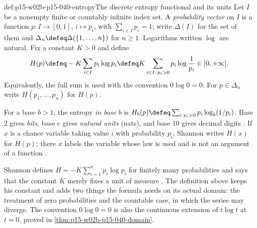\begin{hbdefinition}{def:p15-w02b-p15-040-entropy}{The discrete entropy functional and its units}
Let \(I\) be a nonempty finite or countably infinite index set. A
\emph{probability vector} on \(I\) is a function
\(p:I\to[0,1]\), \(i\mapsto p_i\), with \(\sum_{i\in I}p_i=1\); write
\(\Delta(I)\) for the set of them and
\(\Delta_n\defeq\Delta(\{1,\ldots,n\})\) for \(n\geq1\). Logarithms
written \(\log\) are natural. Fix a constant \(K>0\) and define
\[
 H(p)\defeq-K\sum_{i\in I}p_i\log p_i
      \defeq K\sum_{i\in I:\,p_i>0}p_i\log\frac1{p_i}
      \in[0,+\infty].
\]
Equivalently, the full sum is used with the convention \(0\log0=0\).
For \(p\in\Delta_n\) write \(H(p_1,\ldots,p_n)\) for \(H(p)\).

For a base \(b>1\), the entropy \emph{in base \(b\)} is
\(H_b(p)\defeq\sum_{i:\,p_i>0}p_i\log_b(1/p_i)\). Base \(2\) gives
\emph{bits}, base \(e\) gives \emph{natural units} (nats), and base
\(10\) gives decimal digits \cite[pp.~1--2]{Shannon1948MathematicalTheory}.
If \(x\) is a chance variable taking value \(i\) with probability
\(p_i\), Shannon writes \(H(x)\) for \(H(p)\); there \(x\) labels the
variable whose law is used and is not an argument of a function
\cite[p.~11]{Shannon1948MathematicalTheory}.
\end{hbdefinition}

Shannon defines \(H=-K\sum_{i=1}^np_i\log p_i\) for finitely many
probabilities and says that the constant \(K\) merely fixes a unit of
measure \cite[p.~11]{Shannon1948MathematicalTheory}. The definition
above keeps his constant and adds two things the formula needs on its
actual domain: the treatment of zero probabilities and the countable
case, in which the series may diverge. The convention \(0\log0=0\) is
also the continuous extension of \(t\log t\) at \(t=0\), proved in
\cref{thm:p15-w02b-p15-040-domain}.

